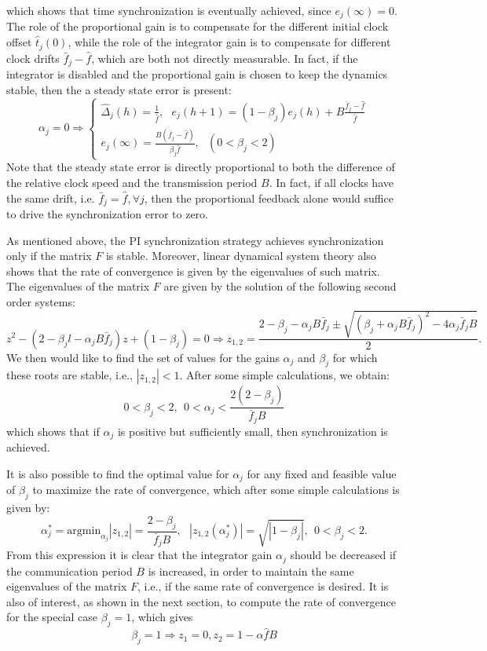 \documentclass[english,a4paper,10pt,final]{article}
\numberwithin{equation}{section}
\numberwithin{figure}{section}
\begin{document}
which shows that time synchronization is eventually achieved, since $e_j(\infty)=0$. The role of the proportional gain is to compensate for the different initial clock offset $\hat t_j(0)$, while the role of the integrator gain is to compensate for different clock drifts $\bar f_j-\hat f$, which are both not directly measurable. In fact, if the integrator is disabled and the proportional gain is chosen to keep the dynamics stable, then the a steady state error is present:
$$ \alpha_j=0 \Longrightarrow \left\{\begin{array}{l}  \hat{\Delta}_j(h)=\frac{1}{\hat f}, \ \ \  e_j(h+1) = (1-\beta_j)e_j(h)+B\frac{\bar f_j-\hat f}{\hat f} \\ e_j(\infty) =   \frac{B(\bar f_j-\hat f)}{\beta_j\hat f}, \ \ \ (0<\beta_j<2)\end{array}\right.$$
Note that the steady state error is directly proportional to both the difference of the relative clock speed and the transmission period $B$. In fact, if all clocks have the same drift, i.e. $\bar f_j=\hat f, \forall j$, then the proportional feedback alone would suffice to drive the synchronization error to zero. 

As mentioned above, the PI synchronization strategy achieves synchronization only if the matrix $F$ is stable. Moreover, linear dynamical system theory also shows that the rate of convergence is given by the eigenvalues of such matrix. The eigenvalues of the matrix $F$ are given by the solution of the following second order systems:
$$ z^2-(2-\beta_jl-\alpha_j B \bar f_j)z+(1-\beta_j)=0\Longrightarrow z_{1,2}= \frac{2-\beta_j-\alpha_j B \bar f_j\pm \sqrt{(\beta_j+\alpha_j B \bar f_j)^2-4\alpha_j\bar f_j B}}{2}.$$
We then would like to find the set of values for the gains $\alpha_j$ and $\beta_j$ for which these roots are stable, i.e., $|z_{1,2}|<1$. After some simple calculations, we obtain:
\begin{equation} \label{eqn:alpha_beta}
0<\beta_j < 2, \ \  0<\alpha_j < \frac{2(2-\beta_j)}{\bar f_j B} 
 \end{equation}
which shows that if $\alpha_j$ is positive but sufficiently small, then synchronization is achieved.

 It is also possible to find the optimal value for $\alpha_j$ for any fixed and feasible value of $\beta_j$ to maximize the rate of convergence, which after some simple calculations is given by:
\begin{equation}\label{eqn:alpha_star}
\alpha_j^* = \mathrm{argmin}_{\alpha_j} |z_{1,2}|=\frac{2-\beta_j}{\bar f_j B}, \ \ \ |z_{1,2}(\alpha_j^*)|=\sqrt{|1-\beta_j|}, \ \ 0<\beta_j<2.
\end{equation}
From this expression it is clear that the integrator gain $\alpha_j$ should be decreased if the communication period $B$ is increased, in order to maintain the same eigenvalues of the matrix $F$, i.e., if the same rate of convergence is desired. 
It is also of interest, as shown in the next section, to compute the rate of convergence for the special case $\beta_j=1$, which gives
\begin{equation}\label{eqn:rho_alpha} \beta_j=1 \Longrightarrow z_1 = 0, z_2 = 1-\alpha \hat f B
\end{equation}
\end{document}
